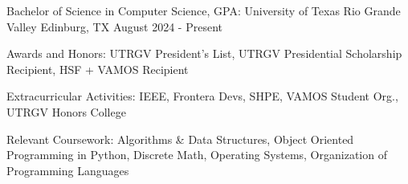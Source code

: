 

\begin{cventries}

  \cventry
    {Bachelor of Science in Computer Science, GPA: {\fontsize{10.5pt}{1em}}} %
    {University of Texas Rio Grande Valley} %
    {Edinburg, TX} %
    {August 2024 - Present} %
    {
      \begin{cvitems}
        \item {Awards and Honors: UTRGV President's List, UTRGV Presidential Scholarship Recipient, HSF + VAMOS Recipient}
        \item {Extracurricular Activities: IEEE, Frontera Devs, SHPE, VAMOS Student Org., UTRGV Honors College}
        \item {Relevant Coursework: Algorithms \& Data Structures, Object Oriented Programming in Python, Discrete Math, Operating Systems, Organization of Programming Languages}
      \end{cvitems}
    }

\end{cventries}
